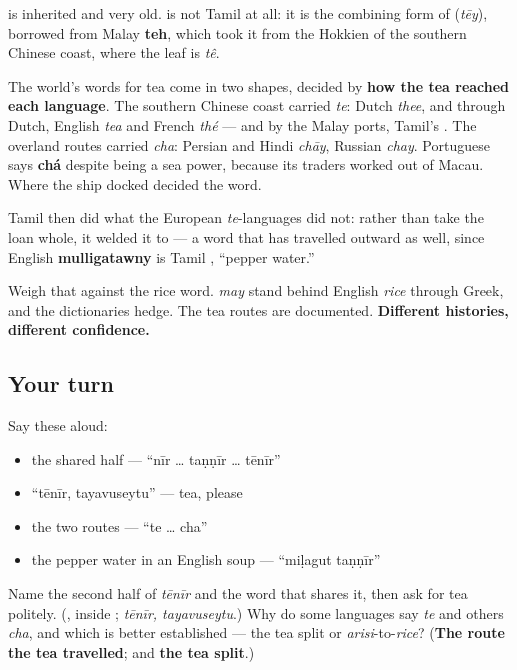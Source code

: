 \begin{cousinweb}
\textbf{} is inherited and very old. \textbf{} is not Tamil at all: it is the combining form of \textbf{} (\emph{tēy}), borrowed from Malay \textbf{teh}, which took it from the Hokkien of the southern Chinese coast, where the leaf is \emph{tê}.

The world's words for tea come in two shapes, decided by \textbf{how the tea reached each language}. The southern Chinese coast carried \emph{te}: Dutch \emph{thee}, and through Dutch, English \emph{tea} and French \emph{thé} — and by the Malay ports, Tamil's \textbf{}. The overland routes carried \emph{cha}: Persian and Hindi \emph{chāy}, Russian \emph{chay}. Portuguese says \textbf{chá} despite being a sea power, because its traders worked out of Macau. Where the ship docked decided the word.

Tamil then did what the European \emph{te}-languages did not: rather than take the loan whole, it welded it to \textbf{} — a word that has travelled outward as well, since English \textbf{mulligatawny} is Tamil \textbf{}, \textquotedblleft{}pepper water.\textquotedblright{}

Weigh that against the rice word. \textbf{} \emph{may} stand behind English \emph{rice} through Greek, and the dictionaries hedge. The tea routes are documented. \textbf{Different histories, different confidence.}
\end{cousinweb}

\subsection*{Your turn}
Say these aloud:

\begin{itemize}
\raggedright
  \item the shared half — \textquotedblleft{}nīr … taṇṇīr … tēnīr\textquotedblright{}
  \item \textquotedblleft{}tēnīr, tayavuseytu\textquotedblright{} — tea, please
  \item the two routes — \textquotedblleft{}te … cha\textquotedblright{}
  \item the pepper water in an English soup — \textquotedblleft{}miḷagut taṇṇīr\textquotedblright{}
\end{itemize}

\begin{tcolorbox}[breakable,colback=teal!4,colframe=teal!35!black,title={Before you move on}]
Name the second half of \emph{tēnīr} and the word that shares it, then ask for tea politely. (\textbf{}, inside \textbf{}; \emph{tēnīr, tayavuseytu}.) Why do some languages say \emph{te} and others \emph{cha}, and which is better established — the tea split or \emph{arisi}-to-\emph{rice}? (\textbf{The route the tea travelled}; and \textbf{the tea split}.)
\end{tcolorbox}
